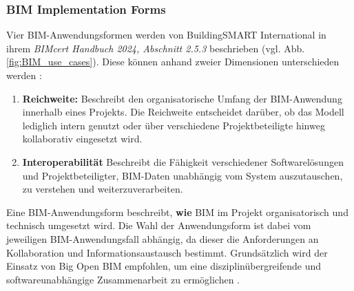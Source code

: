 \subsubsection{BIM Implementation Forms}
\begin{German}
    Vier BIM-Anwendungsformen werden von BuildingSMART International in ihrem \textit{BIMcert Handbuch 2024, Abschnitt 2.5.3} beschrieben (vgl. Abb. \ref{fig:BIM_use_cases}). Diese können anhand zweier Dimensionen unterschieden werden \cite{astourLehrbuchGrundlagenBIMArbeitsmethode2022}:

    \begin{enumerate}
        \item \textbf{Reichweite:} Beschreibt den organisatorische Umfang der BIM-Anwendung innerhalb eines Projekts. Die Reichweite entscheidet darüber, ob das Modell lediglich intern genutzt oder über verschiedene Projektbeteiligte hinweg kollaborativ eingesetzt wird.
        \item \textbf{Interoperabilität} Beschreibt die Fähigkeit verschiedener Softwarelösungen und Projektbeteiligter, BIM-Daten unabhängig vom System auszutauschen, zu verstehen und weiterzuverarbeiten.
    \end{enumerate}

    Eine BIM-Anwendungsform beschreibt, \textbf{wie} BIM im Projekt organisatorisch und technisch umgesetzt wird.
    Die Wahl der Anwendungsform ist dabei vom jeweiligen BIM-Anwendungsfall abhängig, da dieser die Anforderungen an Kollaboration und Informationsaustausch bestimmt.
    Grundsätzlich wird der Einsatz von Big Open BIM empfohlen, um eine disziplinübergreifende und softwareunabhängige Zusammenarbeit zu ermöglichen \cite{astourLehrbuchGrundlagenBIMArbeitsmethode2022}.
\end{German}

